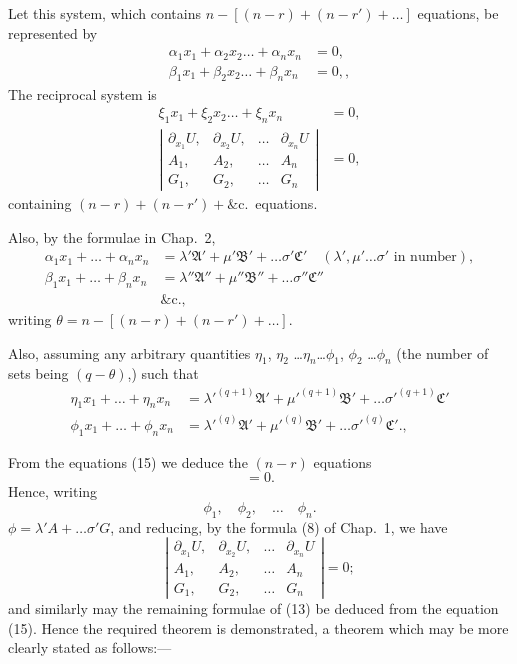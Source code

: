 \documentclass[11pt,a4paper]{book}
\begin{document}
Let this system, which contains $n - [(n-r) + (n-r') + \ldots]$ equations, be represented by
\begin{align*}
\alpha_1 x_1 + \alpha_2 x_2 \ldots + \alpha_n x_n &= 0, \\
\beta_1 x_1 + \beta_2 x_2 \ldots + \beta_n x_n &= 0,
\tag{14},
\end{align*}
The reciprocal system is
\begin{align*}
\xi_1 x_1 + \xi_2 x_2 \ldots + \xi_n x_n &= 0, \\
\left|\begin{array}{cccc}
\partial_{x_1} U, & \partial_{x_2} U, & \ldots & \partial_{x_n} U \\
A_1, & A_2, & \ldots & A_n \\
G_1, & G_2, & \ldots & G_n
\end{array}\right| &= 0
\tag{15},
\end{align*}
containing $(n-r) + (n-r') + \&$c.\ equations.

Also, by the formulae in Chap.\ 2,
\begin{align*}
\alpha_1 x_1 + \ldots + \alpha_n x_n &= \lambda' \mathfrak{A}' + \mu' \mathfrak{B}' + \ldots \sigma' \mathfrak{C}' \quad (\lambda', \mu' \ldots \sigma' \text{ in number}), \\
\beta_1 x_1 + \ldots + \beta_n x_n &= \lambda'' \mathfrak{A}'' + \mu'' \mathfrak{B}'' + \ldots \sigma'' \mathfrak{C}'' \\
&\text{\&c.} \tag{16},
\end{align*}
writing $\theta = n - [(n-r) + (n-r') + \ldots]$.

Also, assuming any arbitrary quantities $\eta_1$, $\eta_2$ \ldots $\eta_n$\ldots $\phi_1$, $\phi_2$ \ldots $\phi_n$ (the number of
sets being $(q-\theta)$,) such that
\begin{align*}
\eta_1 x_1 + \ldots + \eta_n x_n &= \lambda'^{(q+1)} \mathfrak{A}' + \mu'^{(q+1)} \mathfrak{B}' + \ldots \sigma'^{(q+1)} \mathfrak{C}' \\
\phi_1 x_1 + \ldots + \phi_n x_n &= \lambda'^{(q)} \mathfrak{A}' + \mu'^{(q)} \mathfrak{B}' + \ldots \sigma'^{(q)} \mathfrak{C}'.
\tag{17},
\end{align*}

From the equations (15) we deduce the $(n-r)$ equations
\[
= 0
\tag{18}.
\]
Hence, writing
\[
\phi_1, \quad \phi_2, \quad \ldots \quad \phi_n
\tag{19}.
\]
$\phi = \lambda' A + \ldots \sigma' G$,
and reducing, by the formula (8) of Chap.\ 1, we have
\[
\left|\begin{array}{ccccc}
\partial_{x_1} U, & \partial_{x_2} U, & \ldots & \partial_{x_n} U \\
A_1, & A_2, & \ldots & A_n \\
G_1, & G_2, & \ldots & G_n
\end{array}\right| = 0
\tag{20};
\]
and similarly may the remaining formulae of (13) be deduced from the equation (15).
Hence the required theorem is demonstrated, a theorem which may be more clearly
stated as follows:---
\end{document}
